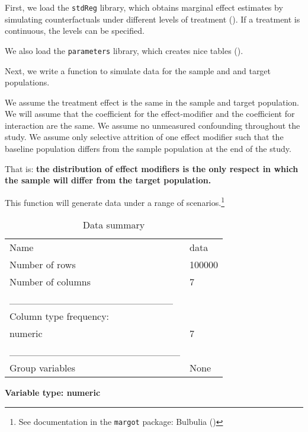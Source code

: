 \documentclass[
  single column]{article}
\begin{document}
First, we load the \texttt{stdReg} library, which obtains marginal
effect estimates by simulating counterfactuals under different levels of
treatment (). If a
treatment is continuous, the levels can be specified.

We also load the \texttt{parameters} library, which creates nice tables
().

Next, we write a function to simulate data for the sample and and target
populations.

We assume the treatment effect is the same in the sample and target
population. We will assume that the coefficient for the effect-modifier
and the coefficient for interaction are the same. We assume no
unmeasured confounding throughout the study. We assume only selective
attrition of one effect modifier such that the baseline population
differs from the sample population at the end of the study.

That is: \textbf{the distribution of effect modifiers is the only
respect in which the sample will differ from the target population.}

This function will generate data under a range of scenarios.\footnote{See
  documentation in the \texttt{margot} package: Bulbulia
  ()}

\begin{longtable}[]{@{}ll@{}}
\caption{Data summary}\tabularnewline
\toprule\noalign{}
\endfirsthead
\endhead
\bottomrule\noalign{}
\endlastfoot
Name & data \\
Number of rows & 100000 \\
Number of columns & 7 \\
\_\_\_\_\_\_\_\_\_\_\_\_\_\_\_\_\_\_\_\_\_\_\_ & \\
Column type frequency: & \\
numeric & 7 \\
\_\_\_\_\_\_\_\_\_\_\_\_\_\_\_\_\_\_\_\_\_\_\_\_ & \\
Group variables & None \\
\end{longtable}

\textbf{Variable type: numeric}
\end{document}
